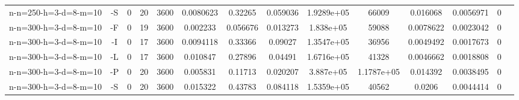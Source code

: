 \documentclass[landscape, a4paper]{article}
\begin{document}
\begin{center}
\begin{tabular}{lccccccccccccc}
n-n=250-h=3-d=8-m=10 & -S & 0 & 20 & 3600 & 0.0080623 & 0.32265 & 0.059036 & 1.9289e+05 & 66009 & 0.016068 & 0.0056971 & 0 & \\
n-n=300-h=3-d=8-m=10 & -F & 0 & 19 & 3600 & 0.002233 & 0.056676 & 0.013273 & 1.838e+05 & 59088 & 0.0078622 & 0.0023042 & 0 & \\
n-n=300-h=3-d=8-m=10 & -I & 0 & 17 & 3600 & 0.0094118 & 0.33366 & 0.09027 & 1.3547e+05 & 36956 & 0.0049492 & 0.0017673 & 0 & \\
n-n=300-h=3-d=8-m=10 & -L & 0 & 17 & 3600 & 0.010847 & 0.27896 & 0.04491 & 1.6716e+05 & 41328 & 0.0046662 & 0.0018808 & 0 & \\
n-n=300-h=3-d=8-m=10 & -P & 0 & 20 & 3600 & 0.005831 & 0.11713 & 0.020207 & 3.887e+05 & 1.1787e+05 & 0.014392 & 0.0038495 & 0 & \\
n-n=300-h=3-d=8-m=10 & -S & 0 & 20 & 3600 & 0.015322 & 0.43783 & 0.084118 & 1.5359e+05 & 40562 & 0.0206 & 0.0044414 & 0 & \\
\end{tabular}
\end{center}
\end{document}

